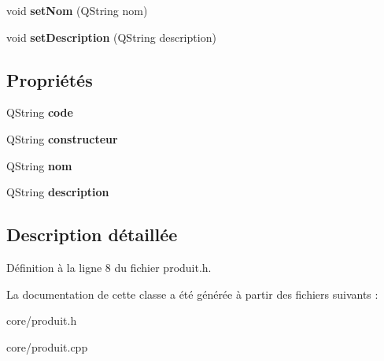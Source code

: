 \begin{DoxyCompactItemize}
\item 
\hypertarget{class_core_1_1_produit_ac6b8005023ed5b2fb55ecb323e45178c}{
void {\bfseries setNom} (QString nom)}
\label{d3/d87/class_core_1_1_produit_ac6b8005023ed5b2fb55ecb323e45178c}

\item 
\hypertarget{class_core_1_1_produit_ab52592d90eb5741c5ce0123bb7144942}{
void {\bfseries setDescription} (QString description)}
\label{d3/d87/class_core_1_1_produit_ab52592d90eb5741c5ce0123bb7144942}

\end{DoxyCompactItemize}
\subsection*{Propriétés}
\begin{DoxyCompactItemize}
\item 
\hypertarget{class_core_1_1_produit_a0aba1fa3c724c5869d1ba00f43895136}{
QString {\bfseries code}}
\label{d3/d87/class_core_1_1_produit_a0aba1fa3c724c5869d1ba00f43895136}

\item 
\hypertarget{class_core_1_1_produit_adb00517961528cadfb2ae7a2c91aebe3}{
QString {\bfseries constructeur}}
\label{d3/d87/class_core_1_1_produit_adb00517961528cadfb2ae7a2c91aebe3}

\item 
\hypertarget{class_core_1_1_produit_a99751d8e59c8bcca121479717c65cd07}{
QString {\bfseries nom}}
\label{d3/d87/class_core_1_1_produit_a99751d8e59c8bcca121479717c65cd07}

\item 
\hypertarget{class_core_1_1_produit_a2dd068f7aec5fe95cbbc2a8342a2b561}{
QString {\bfseries description}}
\label{d3/d87/class_core_1_1_produit_a2dd068f7aec5fe95cbbc2a8342a2b561}

\end{DoxyCompactItemize}


\subsection{Description détaillée}


Définition à la ligne 8 du fichier produit.h.



La documentation de cette classe a été générée à partir des fichiers suivants :\begin{DoxyCompactItemize}
\item 
core/produit.h\item 
core/produit.cpp\end{DoxyCompactItemize}
